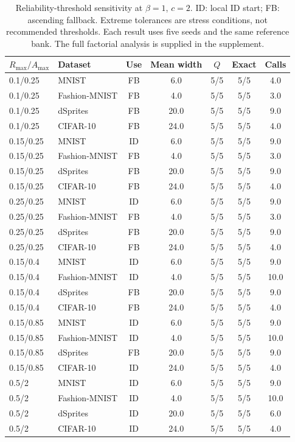 \begin{table}[H]
\caption{Reliability-threshold sensitivity at $\beta=1$, $c=2$. ID: local ID start; FB: ascending fallback. Extreme tolerances are stress conditions, not recommended thresholds. Each result uses five seeds and the same reference bank. The full factorial analysis is supplied in the supplement.}\label{tab:reliability}
\small
\setlength{\tabcolsep}{3pt}
\begin{tabular*}{\textwidth}{@{\extracolsep{\fill}}llccccc@{}}
\toprule
$R_{\max}/A_{\max}$ & Dataset & Use & Mean width & $Q$ & Exact & Calls \\
\midrule
0.1/0.25 & MNIST & FB & 6.0 & 5/5 & 5/5 & 4.0 \\
0.1/0.25 & Fashion-MNIST & FB & 4.0 & 5/5 & 5/5 & 3.0 \\
0.1/0.25 & dSprites & FB & 20.0 & 5/5 & 5/5 & 9.0 \\
0.1/0.25 & CIFAR-10 & FB & 24.0 & 5/5 & 5/5 & 4.0 \\
0.15/0.25 & MNIST & ID & 6.0 & 5/5 & 5/5 & 9.0 \\
0.15/0.25 & Fashion-MNIST & FB & 4.0 & 5/5 & 5/5 & 3.0 \\
0.15/0.25 & dSprites & FB & 20.0 & 5/5 & 5/5 & 9.0 \\
0.15/0.25 & CIFAR-10 & FB & 24.0 & 5/5 & 5/5 & 4.0 \\
0.25/0.25 & MNIST & ID & 6.0 & 5/5 & 5/5 & 9.0 \\
0.25/0.25 & Fashion-MNIST & FB & 4.0 & 5/5 & 5/5 & 3.0 \\
0.25/0.25 & dSprites & FB & 20.0 & 5/5 & 5/5 & 9.0 \\
0.25/0.25 & CIFAR-10 & FB & 24.0 & 5/5 & 5/5 & 4.0 \\
0.15/0.4 & MNIST & ID & 6.0 & 5/5 & 5/5 & 9.0 \\
0.15/0.4 & Fashion-MNIST & ID & 4.0 & 5/5 & 5/5 & 10.0 \\
0.15/0.4 & dSprites & FB & 20.0 & 5/5 & 5/5 & 9.0 \\
0.15/0.4 & CIFAR-10 & FB & 24.0 & 5/5 & 5/5 & 4.0 \\
0.15/0.85 & MNIST & ID & 6.0 & 5/5 & 5/5 & 9.0 \\
0.15/0.85 & Fashion-MNIST & ID & 4.0 & 5/5 & 5/5 & 10.0 \\
0.15/0.85 & dSprites & FB & 20.0 & 5/5 & 5/5 & 9.0 \\
0.15/0.85 & CIFAR-10 & ID & 24.0 & 5/5 & 5/5 & 4.0 \\
0.5/2 & MNIST & ID & 6.0 & 5/5 & 5/5 & 9.0 \\
0.5/2 & Fashion-MNIST & ID & 4.0 & 5/5 & 5/5 & 10.0 \\
0.5/2 & dSprites & ID & 20.0 & 5/5 & 5/5 & 6.0 \\
0.5/2 & CIFAR-10 & ID & 24.0 & 5/5 & 5/5 & 4.0 \\
\bottomrule\end{tabular*}
\end{table}

